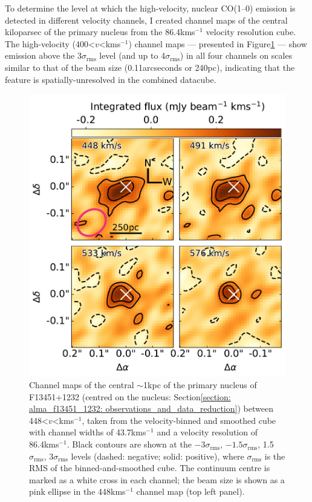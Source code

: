 To determine the level at which the high-velocity, nuclear \mbox{CO(1--0)} emission is detected in different velocity channels, I created channel maps of the central kiloparsec of the primary nucleus from the 86.4\;km\;s$^{-1}$ velocity resolution cube. The high-velocity (400\;\textless\;$v$\;\textless{}\;km\;s$^{-1}$) channel maps --- presented in Figure\;\ref{fig: alma_f13451_1232: channel_maps} --- show emission above the 3$\sigma_\mathrm{rms}$ level (and up to 4$\sigma_\mathrm{rms}$) in all four channels on scales similar to that of the beam size (0.11\;arcseconds or 240\;pc), indicating that the feature is spatially-unresolved in the combined datacube. 

\vspace*{\fill}

\begin{figure}[!h]
    \centering
    \includegraphics[width=0.75\linewidth]{figures/alma_f13451_1232/channel_maps.pdf}
    \caption[Velocity channel maps of the central $\sim$1\;kpc of the primary nucleus of F13451+1232.]{Channel maps of the central $\sim$1\;kpc of the primary nucleus of F13451+1232 (centred on the nucleus: Section\;\ref{section: alma_f13451_1232: observations_and_data_reduction}) between 448\;\textless\;$v$\;\textless{}\;km\;s$^{-1}$, taken from the velocity-binned and smoothed cube with channel widths of 43.7\;km\;s$^{-1}$ and a velocity resolution of 86.4\;km\;s$^{-1}$. Black contours are shown at the $-3\sigma_\mathrm{rms}$, $-1.5\sigma_\mathrm{rms}$, 1.5$\sigma_\mathrm{rms}$, 3$\sigma_\mathrm{rms}$ levels (dashed: negative; solid: positive), where $\sigma_\mathrm{rms}$ is the RMS of the binned-and-smoothed cube. The continuum centre is marked as a white cross in each channel; the beam size is shown as a pink ellipse in the 448\;km\;s$^{-1}$ channel map (top left panel).}
    \label{fig: alma_f13451_1232: channel_maps}
\end{figure}

